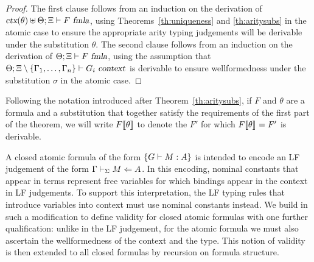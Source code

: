 \begin{proof}
The first clause follows from an induction on the derivation of 
$\mbox{\sl ctx}(\theta) \uplus \Theta;\Xi \vdash F\ \mbox{\sl fmla}$, using  
Theorems~\ref{th:uniqueness} and \ref{th:aritysubs} in the atomic case
to ensure the appropriate arity typing judgements will be derivable under 
the substitution $\theta$.
%
The second clause follows from an induction on the derivation of
$\Theta;\Xi \vdash F\ \mbox{\sl fmla}$, using the assumption that
$\Theta;\Xi\setminus\{\Gamma_1,\ldots,\Gamma_n\} \vdash G_i\ \mbox{\sl context}$
is derivable to ensure wellformedness under the substitution $\sigma$
in the atomic case.
\end{proof}

\noindent Following the notation introduced after Theorem~\ref{th:aritysubs}, 
if $F$ and $\theta$ are a formula and a substitution that together satisfy
the requirements of the first part of the theorem, we will write
$F\llbracket {\theta} \rrbracket$ to denote the $F'$ for which 
$F\llbracket {\theta} \rrbracket_{} = F'$ is derivable.
%

A closed atomic formula of the form
$\left\{G \vdash M:A\right\}$ is intended to encode an LF judgement of the
form $\Gamma \vdash_{\Sigma} M\Leftarrow A$.
%
In this encoding, nominal constants that appear in terms represent
free variables for which bindings appear in the context in LF
judgements.
%
To support this interpretation, the LF typing rules that introduce
variables into context must use nominal constants instead.
%
We build in such a modification to
define validity for closed atomic formulas with one further
qualification: unlike in the LF judgement, 
for the atomic formula we must also ascertain the wellformedness of
the context and the type.
%
This notion of validity is then extended to all closed formulas by
recursion on formula structure.

